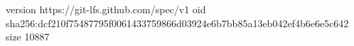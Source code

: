 version https://git-lfs.github.com/spec/v1
oid sha256:dcf210f75487795f0061433759866d03924e6b7bb85a13eb042ef4b6e6e5c642
size 10887

